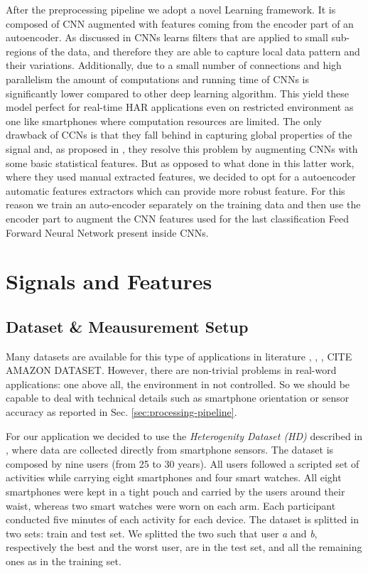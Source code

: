 After the preprocessing pipeline we adopt a novel Learning framework. It is composed of CNN augmented with features coming from the encoder part of an autoencoder. As discussed in \cite{ignatov2018real} CNNs learns filters that are applied to small sub-regions of the data, and therefore they are able to capture local data pattern and their variations. Additionally, due to a small number of connections and high parallelism the amount of computations and running time of CNNs is significantly lower compared to other deep learning algorithm. This yield these model perfect for real-time HAR applications even on restricted environment as one like smartphones where computation resources are limited. The only drawback of CCNs is that they fall behind in capturing global properties of the signal and, as proposed in \cite{ignatov2018real}, they resolve this problem by augmenting CNNs with some basic statistical features. But as opposed to what done in this latter work, where they used manual extracted features, we decided to opt for a autoencoder automatic features extractors which can provide more robust feature. For this reason we train an auto-encoder separately on the training data and then use the encoder part to augment the CNN features used for the last classification Feed Forward Neural Network present inside CNNs.

\section{Signals and Features}
\label{sec:signals-and-features}

\subsection{Dataset \& Meausurement Setup}
\label{subsec:dataset-measurement-setup}

Many datasets are available for this type of applications in
literature \cite{stisen2015smart}, \cite{anguita2013public},
\cite{blunck2013heterogeneity}, CITE AMAZON DATASET. However, there
are non-trivial problems in real-word applications: one above all, the
environment in not controlled. So we should be capable to deal with
technical details such as smartphone orientation or sensor accuracy as
reported in Sec. \ref{sec:processing-pipeline}.

For our application we decided to use the \textit{Heterogenity Dataset (HD)} described in
\cite{blunck2013heterogeneity}, where data are collected directly from
smartphone sensors. The dataset is composed by nine users (from 25 to
30 years). All users followed a scripted set of activities while
carrying eight smartphones and four smart watches. All eight
smartphones were kept in a tight pouch and carried by the users around
their waist, whereas two smart watches were worn on each arm. Each
participant conducted five minutes of each activity for each device.
The dataset is splitted in two sets: train and test set. We splitted
the two such that user \textit{a} and \textit{b}, respectively the
best and the worst user, are in the test set, and all the remaining ones as in the training set.

